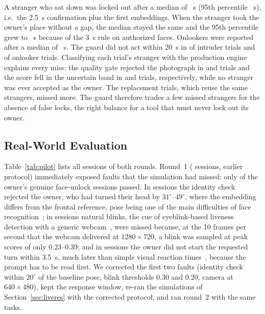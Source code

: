 \documentclass[journal]{IEEEtran}
\begin{document}
A stranger who sat down was locked out after a median of \gIntrMed~s (95th percentile \gIntrQ~s), i.e.\ the 2.5~s confirmation plus the first embeddings. When the stranger took the owner's place without a gap, the median stayed the same and the 95th percentile grew to \gReplQ~s because of the 3~s rule on authorized faces. Onlookers were reported after a median of \gShldMed~s. The guard did not act within 20~s in \gIntrMissed{} of \gIntrN{} intruder trials and \gShldMissed{} of \gShldN{} onlooker trials. Classifying each trial's stranger with the production engine explains every miss: the quality gate rejected the photograph in \gdIntrQuality{} and \gdShldQuality{} trials and the score fell in the uncertain band in \gdIntrUncertain{} and \gdShldUncertain{} trials, respectively, while no stranger was ever accepted as the owner. The replacement trials, which reuse the same strangers, missed \gReplExtra{} more. The guard therefore trades a few missed strangers for the absence of false locks, the right balance for a tool that must never lock out its owner.

\subsection{Real-World Evaluation}\label{sec:pilot}
Table~\ref{tab:pilot} lists all sessions of both rounds. Round~1 (\rwPilotTrials{} sessions, earlier protocol) immediately exposed faults that the simulation had missed: only \rwPilotOwnerPass{} of the owner's \rwPilotOwner{} genuine face-unlock sessions passed. In \rwPilotDiff{} sessions the identity check rejected the owner, who had turned their head by $31^\circ$--$49^\circ$, where the embedding differs from the frontal reference, pose being one of the main difficulties of face recognition~\cite{gupta2024ensemble}; in \rwPilotBlink{} sessions natural blinks, the cue of eyeblink-based liveness detection with a generic webcam~\cite{pan2007eyeblink}, were missed because, at the 10 frames per second that the webcam delivered at $1280\times720$, a blink was sampled at peak scores of only 0.23--0.39; and in \rwPilotNoResp{} sessions the owner did not start the requested turn within 3.5~s, much later than simple visual reaction times~\cite{tatsuno2016reaction}, because the prompt has to be read first. We corrected the first two faults (identity check within $20^\circ$ of the baseline pose, blink thresholds 0.30 and 0.20, camera at $640\times480$), kept the response window, re-ran the simulations of Section~\ref{sec:liveres} with the corrected protocol, and ran round~2 with the same tasks.
\end{document}
